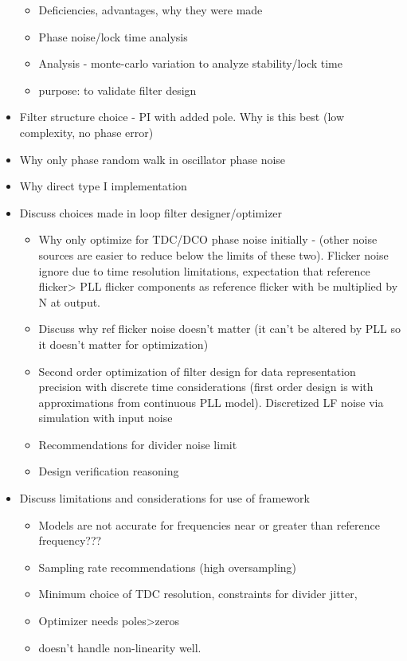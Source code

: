 \begin{itemize}
	\begin{itemize}
		\item Deficiencies, advantages, why they were made
		\item Phase noise/lock time analysis
		\item Analysis - monte-carlo variation to analyze stability/lock time
		\item purpose: to validate filter design
	\end{itemize}
	\item Filter structure choice - PI with added pole. Why is this best (low complexity, no phase error)
	\item Why only phase random walk in oscillator phase noise
	\item Why direct type I implementation
	\item Discuss choices made in loop filter designer/optimizer
	\begin{itemize}
		\item Why only optimize for TDC/DCO phase noise initially - (other noise sources are easier to reduce below the limits of these two). Flicker noise ignore due to time resolution limitations, expectation that reference flicker> PLL flicker components as reference flicker with be multiplied by N at output.
		\item Discuss why ref flicker noise doesn't matter (it can't be altered by PLL so it doesn't matter for optimization)
		\item Second order optimization of filter design for data representation precision with discrete time considerations (first order design is with approximations from continuous PLL model). Discretized LF noise via simulation with input noise
		\item Recommendations for divider noise limit
		\item Design verification reasoning
	\end{itemize}
	\item Discuss limitations and considerations for use of framework
	\begin{itemize}
		\item Models are not accurate for frequencies near or greater than reference frequency???
		\item Sampling rate recommendations (high oversampling)
		\item Minimum choice of TDC resolution, constraints for divider jitter,
		\item Optimizer needs poles>zeros
		\item doesn't handle non-linearity well.
	\end{itemize}
\end{itemize}

